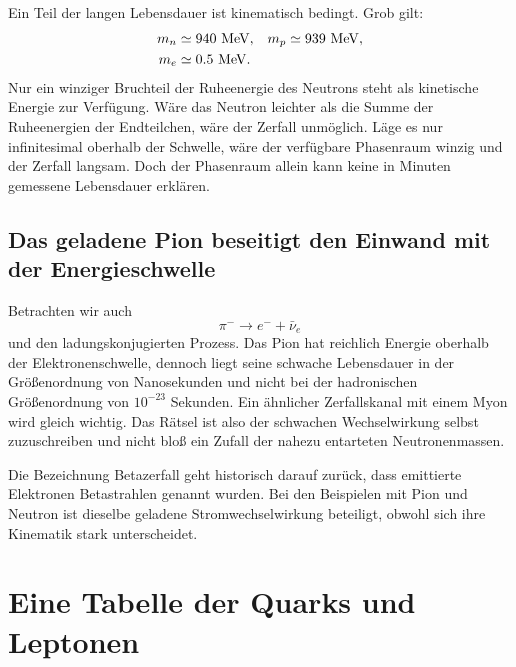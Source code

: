 Ein Teil der langen Lebensdauer ist kinematisch bedingt. Grob gilt:
\begin{equation}
\begin{aligned}
m_n&\simeq940\ {\rm MeV},
&
m_p&\simeq939\ {\rm MeV},
\\
m_e&\simeq0.5\ {\rm MeV}.
\end{aligned}
\end{equation}
Nur ein winziger Bruchteil der Ruheenergie des Neutrons steht als kinetische Energie zur Verfügung. Wäre das Neutron leichter als die Summe der Ruheenergien der Endteilchen, wäre der Zerfall unmöglich. Läge es nur infinitesimal oberhalb der Schwelle, wäre der verfügbare Phasenraum winzig und der Zerfall langsam. Doch der Phasenraum allein kann keine in Minuten gemessene Lebensdauer erklären.

\subsection{Das geladene Pion beseitigt den Einwand mit der Energieschwelle}

Betrachten wir auch
\begin{equation}
\pi^-\longrightarrow e^-+\bar\nu_e
\end{equation}
und den ladungskonjugierten Prozess. Das Pion hat reichlich Energie oberhalb der Elektronenschwelle, dennoch liegt seine schwache Lebensdauer in der Größenordnung von Nanosekunden und nicht bei der hadronischen Größenordnung von \(10^{-23}\) Sekunden. Ein ähnlicher Zerfallskanal mit einem Myon wird gleich wichtig. Das Rätsel ist also der schwachen Wechselwirkung selbst zuzuschreiben und nicht bloß ein Zufall der nahezu entarteten Neutronenmassen.


Die Bezeichnung Betazerfall geht historisch darauf zurück, dass emittierte Elektronen Betastrahlen genannt wurden. Bei den Beispielen mit Pion und Neutron ist dieselbe geladene Stromwechselwirkung beteiligt, obwohl sich ihre Kinematik stark unterscheidet.

\section{Eine Tabelle der Quarks und Leptonen}

